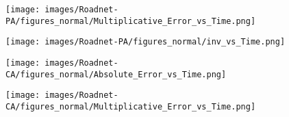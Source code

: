 \begin{figure*}[htbp]
\begin{subfigure}[b]{\textwidth}
\begin{minipage}[b]{0.3\textwidth}
		\texttt{[image: images/Roadnet-PA/figures\_normal/Multiplicative\_Error\_vs\_Time.png]} %
	\end{minipage}%
	\begin{minipage}[b]{0.3\textwidth}
		\centering
		\texttt{[image: images/Roadnet-PA/figures\_normal/inv\_vs\_Time.png]} %
	\end{minipage}
\end{subfigure}
	\begin{subfigure}[b]{\textwidth}
		\centering
		\begin{minipage}[b]{0.05\textwidth}
			\centering
		\end{minipage}%
		\begin{minipage}[b]{0.3\textwidth}
			\centering
			\texttt{[image: images/Roadnet-CA/figures\_normal/Absolute\_Error\_vs\_Time.png]} %
			
		\end{minipage}%
		\begin{minipage}[b]{0.3\textwidth}
			\centering
			
			\texttt{[image: images/Roadnet-CA/figures\_normal/Multiplicative\_Error\_vs\_Time.png]} %
			
		\end{minipage}%
		\begin{minipage}[b]{0.3\textwidth}
			\centering
			

\end{minipage}
\end{subfigure}
\end{figure*}
